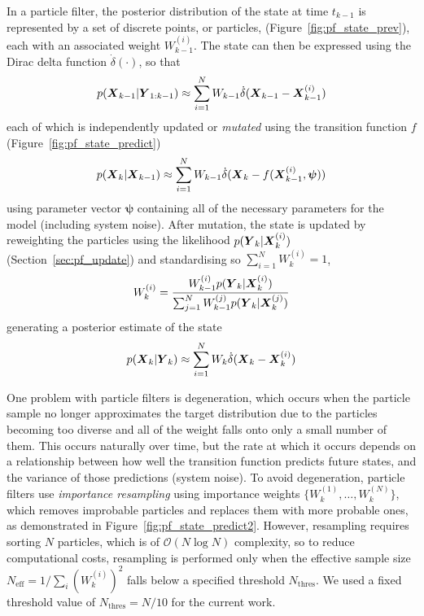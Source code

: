 \afterpage{\clearpage}

In a particle filter, the posterior distribution of the state at time $t_{k-1}$
is represented by a set of discrete points, or particles, (Figure~\ref{fig:pf_state_prev}),
each with an associated weight $W_{k-1}^{(i)}$.
The state can then be expressed using the Dirac delta function $\dot\delta(\cdot)$,
so that
\begin{equation*}
p(\mbox{$\boldsymbol{X}$}_{k-1} | \mbox{$\boldsymbol{Y}$}_{1:k-1}) \approx 
    \sum_{i=1}^N W_{k-1} \dot\delta(\mbox{$\boldsymbol{X}$}_{k-1} - \mbox{$\boldsymbol{X}$}_{k-1}^{(i)})
\end{equation*}
each of which is independently updated or \emph{mutated} using the transition function $f$ (Figure~\ref{fig:pf_state_predict})
\begin{equation*}
p(\mbox{$\boldsymbol{X}$}_k | \mbox{$\boldsymbol{X}$}_{k-1}) \approx 
    \sum_{i=1}^N W_{k-1} \dot\delta(\mbox{$\boldsymbol{X}$}_{k} - f(\mbox{$\boldsymbol{X}$}_{k-1}^{(i)}, \boldsymbol{\psi}))
\end{equation*}
using parameter vector $\boldsymbol{\psi}$ containing all of the necessary parameters
for the model (including system noise).
After mutation, 
the state is updated by reweighting the particles using the likelihood $p(\mbox{$\boldsymbol{Y}$}_k | \mbox{$\boldsymbol{X}$}_k^{(i)})$ 
(Section~\ref{sec:pf_update}) and standardising so $\sum_{i=1}^N W_k^{(i)} = 1$,
\begin{equation*}
W_k^{(i)} = \frac{W_{k-1}^{(i)} p(\mbox{$\boldsymbol{Y}$}_k | \mbox{$\boldsymbol{X}$}_k^{(i)})}{
    \sum_{j=1}^N W_{k-1}^{(j)} p(\mbox{$\boldsymbol{Y}$}_k | \mbox{$\boldsymbol{X}$}_k^{(j)})
}
\end{equation*}
generating a posterior estimate of the state
\begin{equation*}
p(\mbox{$\boldsymbol{X}$}_k | \mbox{$\boldsymbol{Y}$}_k) \approx  
    \sum_{i=1}^N W_{k} \dot\delta(\mbox{$\boldsymbol{X}$}_{k} - \mbox{$\boldsymbol{X}$}_{k}^{(i)})
\end{equation*}

One problem with particle filters is degeneration,
which occurs when the particle sample no longer approximates the target distribution
due to the particles becoming too diverse
and all of the weight falls onto only a small number of them.
This occurs naturally over time, but the rate at which it occurs depends 
on a relationship between how well the transition function predicts future states,
and the variance of those predictions (system noise).
To avoid degeneration,
particle filters use \emph{importance resampling}
using importance weights $\{W_k^{(1)}, \ldots, W_k^{(N)}\}$,
which removes improbable particles and replaces them with more probable ones,
as demonstrated in Figure~\ref{fig:pf_state_predict2}.
However, resampling requires sorting $N$ particles,
which is of $\mathcal{O}(N\log N)$ complexity,
so to reduce computational costs, resampling is performed only when
the effective sample size $N_{\text{eff}} = 1 / \sum_i (W_k^{(i)})^2$
falls below a specified threshold $N_{\text{thres}}$.
We used a fixed threshold value of $N_{\text{thres}} = N/10$
for the current work.

